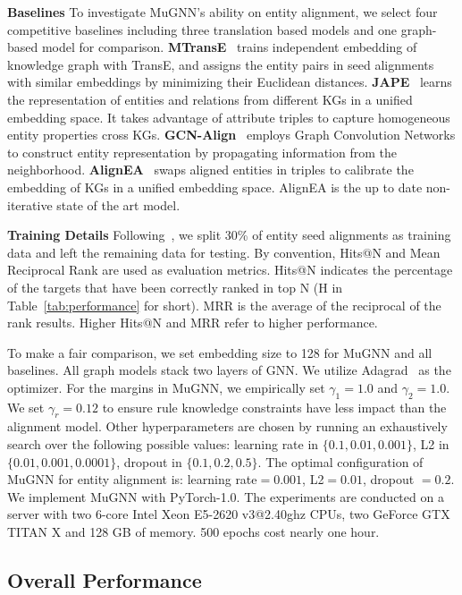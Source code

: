 \documentclass[11pt,a4paper]{article}
\newcommand{\vpara}[1]{\vspace{0.1in}\noindent\textbf{#1 }}
\begin{document}
\vpara{Baselines}
To investigate MuGNN's ability on entity alignment, we select four competitive baselines including three translation based models and one graph-based model for comparison. \textbf{MTransE}~\cite{chen2016multilingual} trains independent embedding of knowledge graph with TransE, and assigns the entity pairs in seed alignments with similar embeddings by minimizing their Euclidean distances. \textbf{JAPE}~\cite{sun2017cross} learns the representation of entities and relations from different KGs in a unified embedding space. It takes advantage of attribute triples to capture homogeneous entity properties cross KGs. \textbf{GCN-Align}~\cite{wang2018cross} employs Graph Convolution Networks to construct entity representation by propagating information from the neighborhood.  \textbf{AlignEA}~\cite{sun2018bootstrapping} swaps aligned entities in triples to calibrate the embedding of KGs in a unified embedding space. AlignEA is the up to date non-iterative state of the art model.

\vpara{Training Details}
Following~\citet{sun2017cross, sun2018bootstrapping}, we split 30\% of entity seed alignments as training data and left the remaining data for testing. By convention, Hits@N and Mean Reciprocal Rank are used as evaluation metrics. Hits@N indicates the percentage of the targets that have been correctly ranked in top N (H in Table~\ref{tab:performance} for short). MRR is the average of the reciprocal of the rank results. Higher Hits@N and MRR refer to higher performance.

To make a fair comparison, we set embedding size to 128 for MuGNN and all baselines. All graph models stack two layers of GNN. We utilize Adagrad~\cite{duchi2011adaptive} as the optimizer. For the margins in MuGNN, we empirically set $\gamma_1=1.0$ and $\gamma_2=1.0$. We set $\gamma_r=0.12$ to ensure rule knowledge constraints have less impact than the alignment model. Other hyperparameters are chosen by running an exhaustively search over the following possible values: learning rate in $\{0.1, 0.01, 0.001\}$, L2 in $\{0.01, 0.001, 0.0001\}$, dropout in $\{0.1, 0.2, 0.5\}$. The optimal configuration of MuGNN for entity alignment is: learning rate$=0.001$, L2$=0.01$, dropout $= 0.2$. We implement MuGNN with PyTorch-1.0. The experiments are conducted on a server with two 6-core Intel Xeon E5-2620 v3@2.40ghz CPUs, two GeForce GTX TITAN X and 128 GB of memory. 500 epochs cost nearly one hour.

\subsection{Overall Performance}
\end{document}
